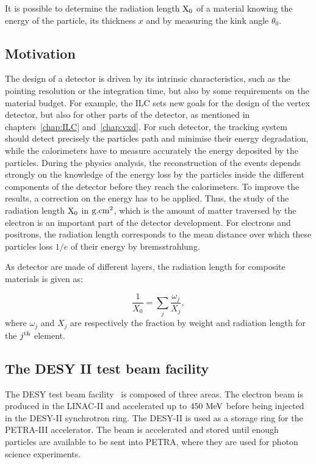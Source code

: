     It is possible to determine the radiation length $\rm{X_0}$ of a material knowing the energy of the particle, its thickness $x$ and by measuring the kink angle $\theta_0$.

    \subsection{Motivation}

    The design of a detector is driven by its intrinsic characteristics, such as the pointing resolution or the integration time, but also by some requirements on the material budget.
    For example, the \gls{ILC} sets new goals for the design of the vertex detector, but also for other parts of the detector, as mentioned in chapters~\ref{chap:ILC} and~\ref{chap:vxd}.
    For such detector, the tracking system should detect precisely the particles path and minimise their energy degradation, while the calorimeters have to measure accurately the energy deposited by the particles.
    During the physics analysis, the reconstruction of the events depends strongly on the knowledge of the energy loss by the particles inside the different components of the detector before they reach the calorimeters. 
    To improve the results, a correction on the energy has to be applied.
    Thus, the study of the radiation length $\rm{X_{0}}$ in $\rm{g.cm}^{2}$, which is the amount of matter traversed by the electron is an important part of the detector development.
    For electrons and positrons, the radiation length corresponds to the mean distance over which these particles loss $1/e$ of their energy by bremsstrahlung.

    As detector are made of different layers, the radiation length for composite materials is given as:

    \begin{equation}
      \frac{1}{X_{0}} = \sum_{j} \frac{\omega_{j}}{X_{j}},
    \end{equation}
   where $\omega_{j}$ and $X_{j}$ are respectively the fraction by weight and radiation length for the $j^{\rm{th}}$ element.

    \subsection{The DESY II test beam facility}

    The \gls{DESY} test beam facility~\cite{DESYII} is composed of three areas.
    The electron beam is produced in the LINAC-II and accelerated up to $450~\rm{MeV}$ before being injected in the DESY-II synchrotron ring.
    The DESY-II is used as a storage ring for the PETRA-III accelerator. 
    The beam is accelerated and stored until enough particles are available to be sent into PETRA, where they are used for photon science experiments.
    
